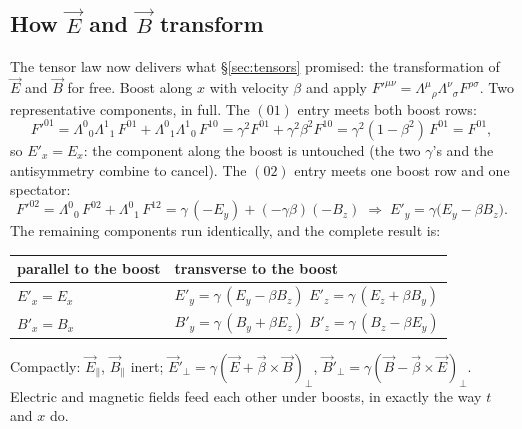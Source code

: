\documentclass[11pt]{article}
\theoremstyle{plain}
\theoremstyle{definition}
\theoremstyle{remark}
\newcommand{\vE}{\vec{E}}
\newcommand{\vB}{\vec{B}}
\begin{document}
\subsection{How $\vE$ and $\vB$ transform}
\label{sec:E-B-transform}

The tensor law now delivers what \S\ref{sec:tensors} promised: the
transformation of $\vE$ and $\vB$ for free. Boost along $x$ with
velocity $\beta$ and apply
$F'^{\mu\nu} = \Lambda^\mu{}_\rho \Lambda^\nu{}_\sigma F^{\rho\sigma}$.
Two representative components, in full. The $(01)$ entry meets both
boost rows:
\begin{equation}
  F'^{01}
  = \Lambda^0{}_0\Lambda^1{}_1\,F^{01}
  + \Lambda^0{}_1\Lambda^1{}_0\,F^{10}
  = \gamma^2 F^{01} + \gamma^2\beta^2 F^{10}
  = \gamma^2(1 - \beta^2)\,F^{01}
  = F^{01} ,
\end{equation}
so $E'_x = E_x$: the component along the boost is untouched (the two
$\gamma$'s and the antisymmetry combine to cancel). The $(02)$ entry
meets one boost row and one spectator:
\begin{equation}
  F'^{02}
  = \Lambda^0{}_0\,F^{02} + \Lambda^0{}_1\,F^{12}
  = \gamma\,(-E_y) + (-\gamma\beta)(-B_z)
  \;\Longrightarrow\;
  E'_y = \gamma\bigl(E_y - \beta B_z\bigr) .
\end{equation}
The remaining components run identically, and the complete result is:
\begin{center}
\begin{tabular}{ll}
\toprule
parallel to the boost & transverse to the boost \\
\midrule
$E'_x = E_x$ &
$E'_y = \gamma\,(E_y - \beta B_z)$
\hspace{1.2em}
$E'_z = \gamma\,(E_z + \beta B_y)$ \\[3pt]
$B'_x = B_x$ &
$B'_y = \gamma\,(B_y + \beta E_z)$
\hspace{1.05em}
$B'_z = \gamma\,(B_z - \beta E_y)$ \\
\bottomrule
\end{tabular}
\end{center}
Compactly: $\vE_\parallel$, $\vB_\parallel$ inert;
$\vE'_\perp = \gamma(\vE + \vec\beta\times\vB)_\perp$,
$\vB'_\perp = \gamma(\vB - \vec\beta\times\vE)_\perp$. Electric and
magnetic fields feed each other under boosts, in exactly the way
$t$ and $x$ do.
\end{document}
